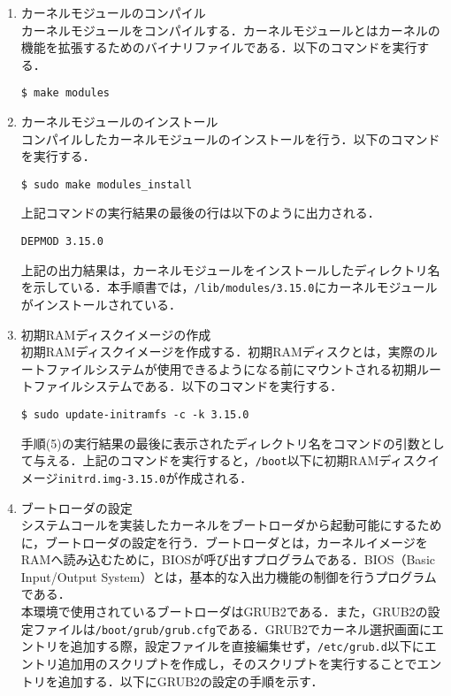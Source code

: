 \documentclass[12pt]{jsarticle}
\begin{document}
\begin{enumerate}
\item カーネルモジュールのコンパイル \\
  カーネルモジュールをコンパイルする．カーネルモジュールとはカーネルの機能を拡張するためのバイナリファイルである．以下のコマンドを実行する．

\begin{verbatim}
$ make modules
\end{verbatim}
  
\item カーネルモジュールのインストール \\
  コンパイルしたカーネルモジュールのインストールを行う．以下のコマンドを実行する．

\begin{verbatim}
$ sudo make modules_install
\end{verbatim}
上記コマンドの実行結果の最後の行は以下のように出力される．

\begin{verbatim}
DEPMOD 3.15.0
\end{verbatim}
上記の出力結果は，カーネルモジュールをインストールしたディレクトリ名を示している．本手順書では，\verb|/lib/modules/3.15.0|にカーネルモジュールがインストールされている．

\item 初期RAMディスクイメージの作成 \\
  初期RAMディスクイメージを作成する．初期RAMディスクとは，実際のルートファイルシステムが使用できるようになる前にマウントされる初期ルートファイルシステムである．以下のコマンドを実行する．

\begin{verbatim}
$ sudo update-initramfs -c -k 3.15.0
\end{verbatim}
手順(5)の実行結果の最後に表示されたディレクトリ名をコマンドの引数として与える．上記のコマンドを実行すると，\verb|/boot|以下に初期RAMディスクイメージ\verb|initrd.img-3.15.0|が作成される．

\item ブートローダの設定 \\
  システムコールを実装したカーネルをブートローダから起動可能にするために，ブートローダの設定を行う．ブートローダとは，カーネルイメージをRAMへ読み込むために，BIOSが呼び出すプログラムである．BIOS（Basic Input/Output System）とは，基本的な入出力機能の制御を行うプログラムである\cite{daniel2007}．\\
  本環境で使用されているブートローダはGRUB2である．また，GRUB2の設定ファイルは\verb|/boot/grub/grub.cfg|である．GRUB2でカーネル選択画面にエントリを追加する際，設定ファイルを直接編集せず，\verb|/etc/grub.d|以下にエントリ追加用のスクリプトを作成し，そのスクリプトを実行することでエントリを追加する．以下にGRUB2の設定の手順を示す．
  

\end{enumerate}
\end{document}
